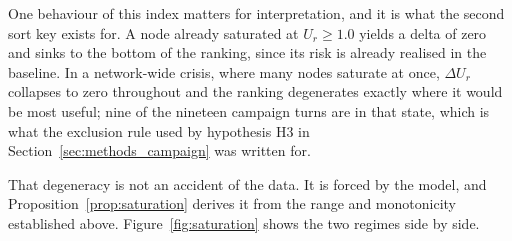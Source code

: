 One behaviour of this index matters for interpretation, and it is what the second sort key
exists for. A node already saturated at $U_r \ge 1.0$ yields a delta of zero and sinks to the
bottom of the ranking, since its risk is already realised in the baseline. In a network-wide
crisis, where many nodes saturate at once, $\Delta U_r$ collapses to zero throughout and the
ranking degenerates exactly where it would be most useful; nine of the nineteen campaign
turns are in that state, which is what the exclusion rule used by hypothesis H3 in
Section~\ref{sec:methods_campaign} was written for.

That degeneracy is not an accident of the data. It is forced by the model, and
Proposition~\ref{prop:saturation} derives it from the range and monotonicity established
above. Figure~\ref{fig:saturation} shows the two regimes side by side.

